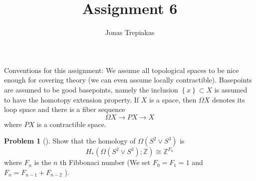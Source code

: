 \documentclass[reqno]{amsart}
\title{Assignment 6}
\author{Jonas Trepiakas}
\date{}
\theoremstyle{definition}
\newtheorem{problem}[theorem]{Problem}
\theoremstyle{remark}
\begin{document}
\maketitle
    Conventions for this assignment: We assume
    all topological spaces to be nice enough for covering
    theory (we can even assume locally contractible).
    Basepoints are assumed to be good basepoints, namely
    the inclusion $\left\{ x \right\} \subset 
    X$ is assumed to have the homotopy extension property.
    If
    $X$ is a space, then $\Omega X$ denotes
    its loop space and there is a fiber sequence
    \[
    \Omega X \to PX \to X
    \] 
    where $PX$ is a contractible space.


    \begin{problem}[]
        Show that the homology of
        $\Omega\left( S^2 \vee S^3 \right) $ is
        \[
        H_* \left( \Omega \left( S^2 \vee S^3 \right) ;
        \mathbb{Z}\right) \cong
        \mathbb{Z}^{F_n}
        \] 
        where $F_n$ is the $n$ th Fibbonaci number
        (We set $F_0 = F_1 = 1$ and
        $F_n = F_{n-1} + F_{n-2}$ ).
    \end{problem}
\end{document}
